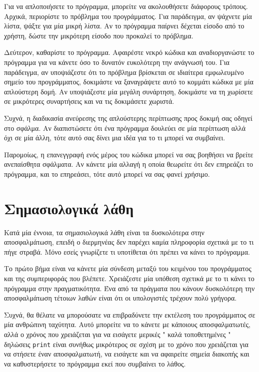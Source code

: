 \documentclass[10pt]{book}
\begin{document}
Για να απλοποιήσετε το πρόγραμμα, μπορείτε να ακολουθήσετε διάφορους τρόπους.  
Αρχικά, περιορίστε το πρόβλημα του προγράμματος.  Για παράδειγμα, αν ψάχνετε μία 
λίστα, ψάξτε για μία μικρή λίστα.  Αν το πρόγραμμα παίρνει δέχεται είσοδο από το χρήστη, δώστε την μικρότερη είσοδο που προκαλεί το πρόβλημα.

Δεύτερον, καθαρίστε το πρόγραμμα.  Αφαιρέστε νεκρό κώδικα και αναδιοργανώστε το 
πρόγραμμα για να κάνετε όσο το δυνατόν ευκολότερη την ανάγνωσή του.  Για παράδειγμα, αν υποψιάζεστε ότι το πρόβλημα βρίσκεται σε ιδιαίτερα εμφωλευμένο σημείο του προγράμματος, δοκιμάστε να ξαναγράψετε αυτό το κομμάτι κώδικα με μία απλούστερη δομή.  Αν υποψιάζεστε μία μεγάλη συνάρτηση, δοκιμάστε να τη χωρίσετε σε μικρότερες συναρτήσεις και να τις δοκιμάσετε χωριστά.

Συχνά, η διαδικασία ανεύρεσης της απλούστερης περίπτωσης προς δοκιμή σας οδηγεί στο σφάλμα.  Αν διαπιστώσετε ότι ένα πρόγραμμα δουλεύει σε μία περίπτωση αλλά όχι σε μία άλλη, τότε αυτό σας δίνει μια ιδέα για το τι μπορεί να συμβαίνει.

Παρομοίως, η επανεγγραφή ενός μέρος του κώδικα μπορεί να σας βοηθήσει να βρείτε ανεπαίσθητα σφάλματα.  Αν κάνετε μία αλλαγή η οποία θεωρείτε ότι δεν επηρεάζει το πρόγραμμα, και το επηρεάσει, τότε αυτό μπορεί να σας φανεί χρήσιμο.



\section{Σημασιολογικά λάθη}

Κατά μία έννοια, τα σημασιολογικά λάθη είναι τα δυσκολότερα στην αποσφαλμάτωση, επειδή ο διερμηνέας δεν παρέχει καμία πληροφορία σχετικά με το τι πήγε στραβά.  Μόνο εσείς γνωρίζετε τι υποτίθεται ότι πρέπει να κάνει το πρόγραμμα.

Το πρώτο βήμα είναι να κάνετε μία σύνδεση μεταξύ του κειμένου του προγράμματος 
και της συμπεριφοράς που βλέπετε.  Χρειάζεστε μία υπόθεση σχετικά με το τι κάνει το πρόγραμμα στην πραγματικότητα.  Ένα από τα πράγματα που κάνουν δυσκολότερη την αποσφαλμάτωση τέτοιων λαθών είναι ότι οι υπολογιστές τρέχουν πολύ γρήγορα.

Συχνά, θα θέλατε να μπορούσατε να επιβραδύνετε την εκτέλεση του προγράμματος σε μία 
ανθρώπινη ταχύτητα.  Αυτό μπορείτε να το κάνετε με κάποιους αποσφαλματωτές, αλλά ο χρόνος που χρειάζεται για να εισάγετε μερικές  " καλά τοποθετημένες "  δηλώσεις  {\tt print}  είναι συνήθως μικρότερος σε σχέση με το χρόνο που χρειάζεται για να στήσετε έναν αποσφαλματωτή, να εισάγετε και να αφαιρείτε σημεία διακοπής και να καθυστερήσετε το πρόγραμμα εκεί που συμβαίνει το λάθος.
\end{document}
